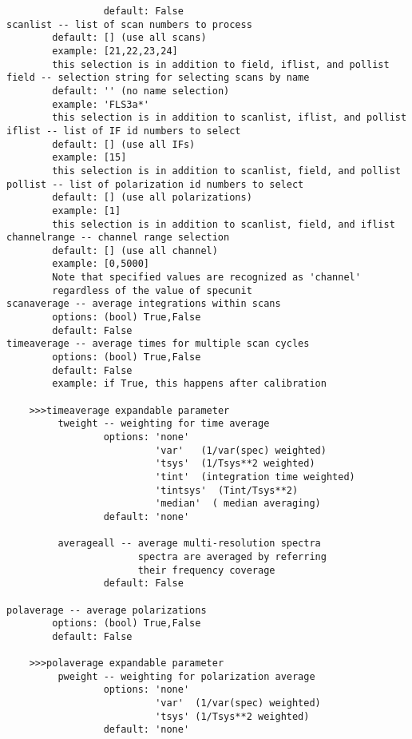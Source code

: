 \begin{verbatim}
                 default: False
scanlist -- list of scan numbers to process
        default: [] (use all scans)
        example: [21,22,23,24]
        this selection is in addition to field, iflist, and pollist
field -- selection string for selecting scans by name
        default: '' (no name selection)
        example: 'FLS3a*'
        this selection is in addition to scanlist, iflist, and pollist
iflist -- list of IF id numbers to select
        default: [] (use all IFs)
        example: [15]
        this selection is in addition to scanlist, field, and pollist
pollist -- list of polarization id numbers to select
        default: [] (use all polarizations)
        example: [1]
        this selection is in addition to scanlist, field, and iflist
channelrange -- channel range selection
        default: [] (use all channel)
        example: [0,5000]
        Note that specified values are recognized as 'channel'
        regardless of the value of specunit 
scanaverage -- average integrations within scans
        options: (bool) True,False
        default: False
timeaverage -- average times for multiple scan cycles
        options: (bool) True,False
        default: False
        example: if True, this happens after calibration

    >>>timeaverage expandable parameter
         tweight -- weighting for time average
                 options: 'none' 
                          'var'   (1/var(spec) weighted)
                          'tsys'  (1/Tsys**2 weighted)
                          'tint'  (integration time weighted)
                          'tintsys'  (Tint/Tsys**2)
                          'median'  ( median averaging)
                 default: 'none'

         averageall -- average multi-resolution spectra
                       spectra are averaged by referring 
                       their frequency coverage
                 default: False

polaverage -- average polarizations
        options: (bool) True,False
        default: False

    >>>polaverage expandable parameter
         pweight -- weighting for polarization average
                 options: 'none'
                          'var'  (1/var(spec) weighted)
                          'tsys' (1/Tsys**2 weighted)
                 default: 'none'


\end{verbatim}
